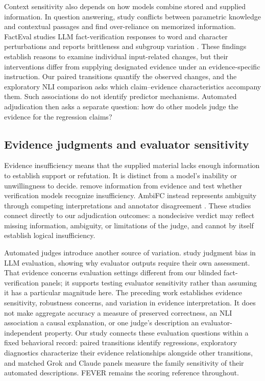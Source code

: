 \documentclass[11pt,letterpaper]{article}
\begin{document}
Context sensitivity also depends on how models combine stored and supplied information. In question answering, \citet{longpre-etal-2021-entity} study conflicts between parametric knowledge and contextual passages and find over-reliance on memorized information. FactEval studies LLM fact-verification responses to word and character perturbations and reports brittleness and subgroup variation \citep{mamta-cocarascu-2025-facteval}. These findings establish reasons to examine individual input-related changes, but their interventions differ from supplying designated evidence under an evidence-specific instruction. Our paired transitions quantify the observed changes, and the exploratory NLI comparison asks which claim--evidence characteristics accompany them. Such associations do not identify predictor mechanisms. Automated adjudication then asks a separate question: how do other models judge the evidence for the regression claims?

\subsection{Evidence judgments and evaluator sensitivity}
Evidence insufficiency means that the supplied material lacks enough information to establish support or refutation. It is distinct from a model's inability or unwillingness to decide. \citet{atanasova-etal-2022-fact} remove information from evidence and test whether verification models recognize insufficiency. AmbiFC instead represents ambiguity through competing interpretations and annotator disagreement \citep{glockner-etal-2024-ambifc}. These studies connect directly to our adjudication outcomes: a nondecisive verdict may reflect missing information, ambiguity, or limitations of the judge, and cannot by itself establish logical insufficiency.

Automated judges introduce another source of variation. \citet{chen-etal-2024-humans} study judgment bias in LLM evaluation, showing why evaluator outputs require their own assessment. That evidence concerns evaluation settings different from our blinded fact-verification panels; it supports testing evaluator sensitivity rather than assuming it has a particular magnitude here. The preceding work establishes evidence sensitivity, robustness concerns, and variation in evidence interpretation. It does not make aggregate accuracy a measure of preserved correctness, an NLI association a causal explanation, or one judge's description an evaluator-independent property. Our study connects these evaluation questions within a fixed behavioral record: paired transitions identify regressions, exploratory diagnostics characterize their evidence relationships alongside other transitions, and matched Grok and Claude panels measure the family sensitivity of their automated descriptions. FEVER remains the scoring reference throughout.
\end{document}
